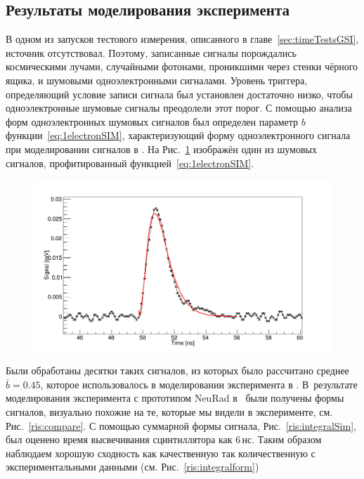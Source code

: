 \subsection{Результаты моделирования эксперимента}

В одном из запусков тестового измерения, описанного в главе~\ref{sec:timeTestsGSI}, источник отсутствовал. Поэтому, записанные сигналы порождались космическими лучами, случайными фотонами, проникшими через стенки чёрного ящика, и шумовыми одноэлектронными сигналами. Уровень триггера, определяющий условие записи сигнала был установлен достаточно низко, чтобы одноэлектронные шумовые сигналы преодолели этот порог. С помощью анализа форм одноэлектронных шумовых сигналов был определен параметр $b$ функции~\eqref{eq:1electronSIM}, характеризующий форму одноэлектронного сигнала при моделировании сигналов в \er.
На Рис.~\ref{ris:1pesignalexp} изображён один из шумовых сигналов, профитированный функцией~\eqref{eq:1electronSIM}. 

\begin{figure}[!ht]
	\centering
	\includegraphics[width=\linewidth]{1pesignalexp.png}
	\label{ris:1pesignalexp}
\end{figure}

Были обработаны десятки таких сигналов, из которых было рассчитано среднее $\bar{b}=0.45$, которое использовалось в моделировании эксперимента в \er.
В~результате моделирования эксперимента с прототипом NeuRad в \er\, были получены формы сигналов, визуально похожие на те, которые мы видели в эксперименте, см. Рис.~\ref{ris:compare}.
С помощью суммарной формы сигнала, Рис.~\ref{ris:integralSim}, был оценено время высвечивания сцинтиллятора как 6\,нс. Таким образом наблюдаем хорошую сходность как качественную так количественную с экспериментальными данными (см. Рис.~\ref{ris:integralform})

